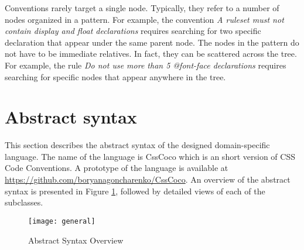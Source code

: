 \documentclass[parskip=full]{uvamscse}
\begin{document}
Conventions rarely target a single node. Typically, they refer to a number of nodes organized in a
pattern. For example, the convention \textit{A ruleset must not contain display and float
declarations} requires searching for two specific declaration that appear under the same parent
node. The nodes in the pattern do not have to be immediate relatives. In fact, they can be scattered
across the tree. For example, the rule \textit{Do not use more than 5 @font-face declarations}
requires searching for specific nodes that appear anywhere in the tree.

\section{Abstract syntax}

This section describes the abstract syntax of the designed domain-specific language. The name of the
language is CssCoco which is an short version of CSS Code Conventions. A prototype of the language
is available at \url{https://github.com/boryanagoncharenko/CssCoco}. An overview of the abstract
syntax is presented in Figure \ref{fig:astgeneral}, followed by detailed views of each of the
subclasses.

\begin{figure}[h!]
  \centering
  \caption{Abstract Syntax Overview}
  \label{fig:astgeneral}
  \texttt{[image: general]}
\end{figure}
\end{document}
